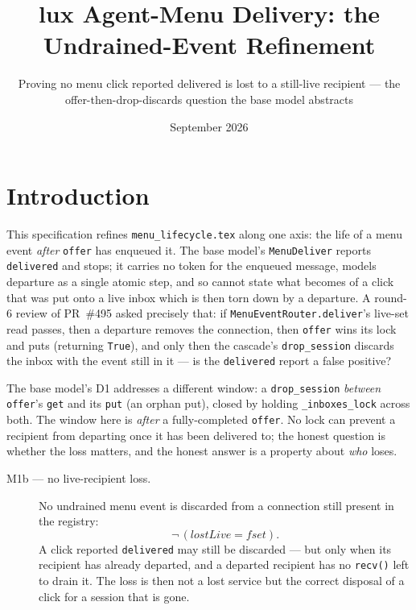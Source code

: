 \documentclass[a4paper,10pt,fleqn]{article}
\begin{document}
\title{lux Agent-Menu Delivery: the Undrained-Event Refinement}
\author{Proving no menu click reported delivered is lost to a still-live
  recipient --- the offer-then-drop-discards question the base model abstracts}
\date{September 2026}
\maketitle

\section{Introduction}

This specification refines \texttt{menu\_lifecycle.tex} along one axis: the
life of a menu event \emph{after} \texttt{offer} has enqueued it. The base
model's \texttt{MenuDeliver} reports \texttt{delivered} and stops; it carries
no token for the enqueued message, models departure as a single atomic step,
and so cannot state what becomes of a click that was put onto a live inbox
which is then torn down by a departure. A round-6 review of PR~\#495 asked
precisely that: if \texttt{MenuEventRouter.deliver}'s live-set read passes,
then a departure removes the connection, then \texttt{offer} wins its lock and
puts (returning \texttt{True}), and only then the cascade's
\texttt{drop\_session} discards the inbox with the event still in it --- is the
\texttt{delivered} report a false positive?

The base model's D1 addresses a different window: a \texttt{drop\_session}
\emph{between} \texttt{offer}'s \texttt{get} and its \texttt{put} (an orphan
put), closed by holding \texttt{\_inboxes\_lock} across both. The window here is
\emph{after} a fully-completed \texttt{offer}. No lock can prevent a recipient
from departing once it has been delivered to; the honest question is whether
the loss matters, and the honest answer is a property about \emph{who} loses.

\begin{description}
  \item[M1b --- no live-recipient loss.] No undrained menu event is discarded
    from a connection still present in the registry:
    \[ \lnot\, (lostLive = fset). \]
    A click reported \texttt{delivered} may still be discarded --- but only
    when its recipient has already departed, and a departed recipient has no
    \texttt{recv()} left to drain it. The loss is then not a lost service but
    the correct disposal of a click for a session that is gone.
\end{description}
\end{document}
